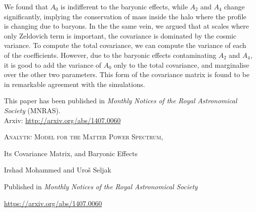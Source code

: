 \documentclass[
  11pt,
  twoside,
  openright,
  titlepage,
  headings=optiontoheadandtoc
]{scrbook}
\begin{document}
We found that $A_0$ is indifferent to the baryonic effects, while
$A_2$ and $A_4$ change significantly, implying the conservation of
mass inside the halo where the profile is changing due to baryons. 
In the the same vein, we argued that at scales where only Zeldovich
term is important, the covariance is dominated by the cosmic variance.
To compute the total covariance, we can compute the variance of 
each of the coefficients. However, due to the baryonic effects contaminating
$A_2$ and $A_4$, it is good to add the variance of $A_0$ only to the
total covariance, and marginalise over the other two parameters. 
This form of the covariance matrix is found to be in remarkable
agreement with the simulations. 

This paper has been published in {\it Monthly Notices of the Royal Astronomical
Society} (MNRAS). 
\\
Arxiv: \url{http://arxiv.org/abs/1407.0060}

\begin{publishedpaper}
  {\fontsize{18}{22}\selectfont\scshape
   Analytic Model for the Matter Power Spectrum,\par
   Its Covariance Matrix, and Baryonic Effects\par}

  \vspace{1.25em}

  {\large
   Irshad Mohammed and Uro\v{s} Seljak\par}

  \vspace{1.25em}
  {\small
   Published in \textit{Monthly Notices of the Royal Astronomical Society}\par
   \url{https://arxiv.org/abs/1407.0060}\par}
\end{publishedpaper}
\end{document}
